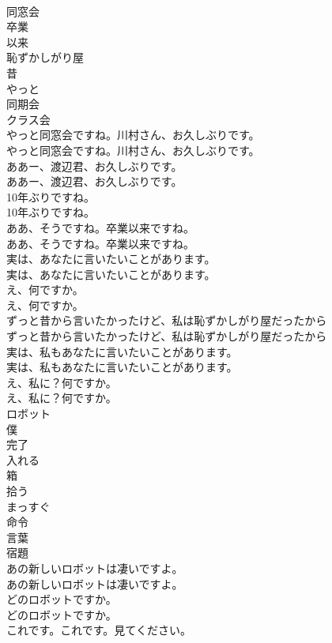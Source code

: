 \documentclass[8pt]{extreport}
\begin{document}
\begin{CJK}{UTF8}{min}
\\	同窓会
\\	卒業
\\	以来
\\	恥ずかしがり屋
\\	昔
\\	やっと
\\	同期会
\\	クラス会
\\	やっと同窓会ですね。川村さん、お久しぶりです。	
\\	やっと同窓会ですね。川村さん、お久しぶりです。 
\\	ああー、渡辺君、お久しぶりです。	
\\	ああー、渡辺君、お久しぶりです。 
\\	10年ぶりですね。	
\\	10年ぶりですね。 
\\	ああ、そうですね。卒業以来ですね。	
\\	ああ、そうですね。卒業以来ですね。 
\\	実は、あなたに言いたいことがあります。	
\\	実は、あなたに言いたいことがあります。 
\\	え、何ですか。	
\\	え、何ですか。 
\\	ずっと昔から言いたかったけど、私は恥ずかしがり屋だったから	
\\	ずっと昔から言いたかったけど、私は恥ずかしがり屋だったから 
\\	実は、私もあなたに言いたいことがあります。	
\\	実は、私もあなたに言いたいことがあります。 
\\	え、私に？何ですか。	
\\	え、私に？何ですか。 
\\	ロボット
\\	僕
\\	完了
\\	入れる
\\	箱
\\	拾う
\\	まっすぐ
\\	命令
\\	言葉
\\	宿題
\\	あの新しいロボットは凄いですよ。	
\\	あの新しいロボットは凄いですよ。 
\\	どのロボットですか。	
\\	どのロボットですか。 
\\	これです。これです。見てください。	

\end{CJK}
\end{document}
